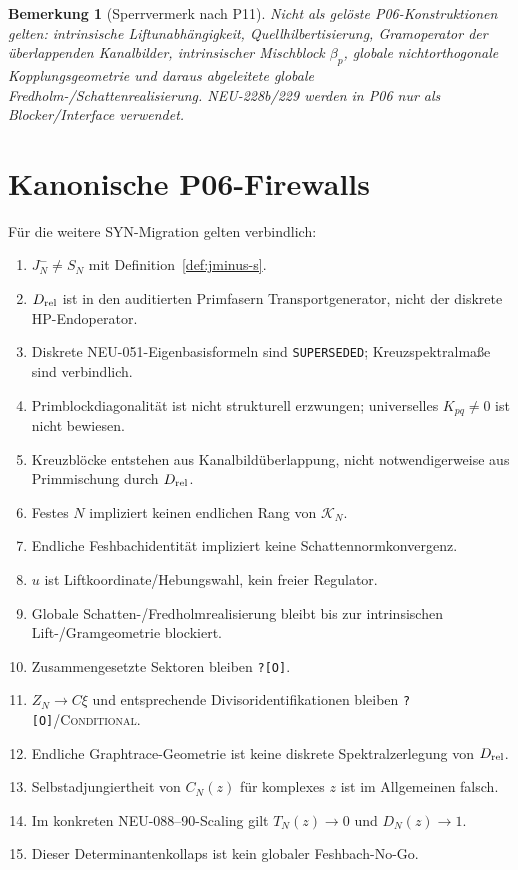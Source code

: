 \documentclass[11pt,a4paper]{amsart}
\newtheorem{remark}[theorem]{Bemerkung}
\newcommand{\Open}{\texttt{?[O]}}
\newcommand{\Conditional}{\textnormal{\textsc{Conditional}}}
\begin{document}
\begin{remark}[Sperrvermerk nach P11]
Nicht als gelöste P06-Konstruktionen gelten: intrinsische Liftunabhängigkeit,
Quellhilbertisierung, Gramoperator der überlappenden Kanalbilder, intrinsischer
Mischblock $\beta_p$, globale nichtorthogonale Kopplungsgeometrie und daraus
abgeleitete globale Fredholm-/Schattenrealisierung. NEU-228b/229 werden in P06
nur als Blocker/Interface verwendet.
\end{remark}

\section{Kanonische P06-Firewalls}

Für die weitere SYN-Migration gelten verbindlich:
\begin{enumerate}
\item $J_N^-\neq S_N$ mit Definition~\ref{def:jminus-s}.
\item $D_{\rm rel}$ ist in den auditierten Primfasern Transportgenerator, nicht
      der diskrete HP-Endoperator.
\item Diskrete NEU-051-Eigenbasisformeln sind \texttt{SUPERSEDED};
      Kreuzspektralmaße sind verbindlich.
\item Primblockdiagonalität ist nicht strukturell erzwungen; universelles
      $K_{pq}\neq0$ ist nicht bewiesen.
\item Kreuzblöcke entstehen aus Kanalbildüberlappung, nicht notwendigerweise
      aus Primmischung durch $D_{\rm rel}$.
\item Festes $N$ impliziert keinen endlichen Rang von $\mathcal K_N$.
\item Endliche Feshbachidentität impliziert keine Schattennormkonvergenz.
\item $u$ ist Liftkoordinate/Hebungswahl, kein freier Regulator.
\item Globale Schatten-/Fredholmrealisierung bleibt bis zur intrinsischen
      Lift-/Gramgeometrie blockiert.
\item Zusammengesetzte Sektoren bleiben \Open.
\item $Z_N\to C\xi$ und entsprechende Divisoridentifikationen bleiben
      \Open/\Conditional.
\item Endliche Graphtrace-Geometrie ist keine diskrete Spektralzerlegung von
      $D_{\rm rel}$.
\item Selbstadjungiertheit von $C_N(z)$ für komplexes $z$ ist im Allgemeinen
      falsch.
\item Im konkreten NEU-088--90-Scaling gilt $T_N(z)\to0$ und $D_N(z)\to1$.
\item Dieser Determinantenkollaps ist kein globaler Feshbach-No-Go.
\end{enumerate}
\end{document}
